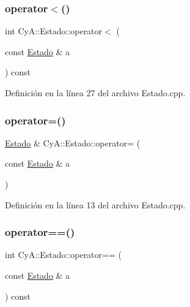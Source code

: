 \subsubsection{\texorpdfstring{operator$<$()}{operator<()}}
{\footnotesize\ttfamily int Cy\+A\+::\+Estado\+::operator$<$ (\begin{DoxyParamCaption}\item[{const \mbox{\hyperlink{class_cy_a_1_1_estado}{Estado}} \&}]{a }\end{DoxyParamCaption}) const}



Definición en la línea 27 del archivo Estado.\+cpp.

\mbox{\label{class_cy_a_1_1_estado_a32736601fb07796167fdc0b6821d2508}} 
\subsubsection{\texorpdfstring{operator=()}{operator=()}}
{\footnotesize\ttfamily \mbox{\hyperlink{class_cy_a_1_1_estado}{Estado}} \& Cy\+A\+::\+Estado\+::operator= (\begin{DoxyParamCaption}\item[{const \mbox{\hyperlink{class_cy_a_1_1_estado}{Estado}} \&}]{a }\end{DoxyParamCaption})}



Definición en la línea 13 del archivo Estado.\+cpp.

\mbox{\label{class_cy_a_1_1_estado_a35f9d60de08befa830c44f2b3e1fd3bc}} 
\subsubsection{\texorpdfstring{operator==()}{operator==()}}
{\footnotesize\ttfamily int Cy\+A\+::\+Estado\+::operator== (\begin{DoxyParamCaption}\item[{const \mbox{\hyperlink{class_cy_a_1_1_estado}{Estado}} \&}]{a }\end{DoxyParamCaption}) const}



